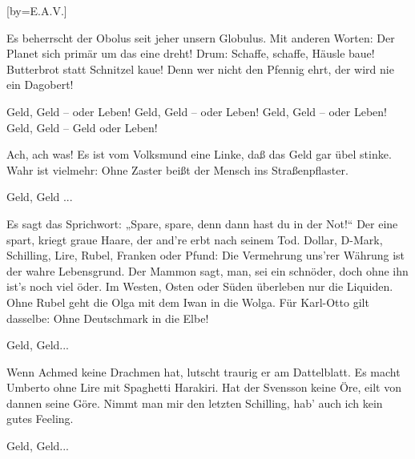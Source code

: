 [by={E.A.V.}]


\beginverse
Es beherrscht der Obolus seit jeher unsern Globulus.
Mit anderen Worten: Der Planet sich primär um das eine dreht!
Drum: Schaffe, schaffe, Häusle baue! Butterbrot statt Schnitzel kaue! 
Denn wer nicht den Pfennig ehrt, der wird nie ein Dagobert!
\endverse

\beginchorus
Geld, Geld -- oder Leben!
Geld, Geld -- oder Leben!
Geld, Geld -- oder Leben!
Geld, Geld -- Geld oder Leben!
\endchorus

\beginverse
Ach, ach was!
Es ist vom Volksmund eine Linke,
daß das Geld gar übel stinke.
Wahr ist vielmehr: Ohne Zaster
beißt der Mensch ins Straßenpflaster.

Geld, Geld ...
\endverse

\beginverse
Es sagt das Sprichwort: „Spare, spare,
denn dann hast du in der Not!“
Der eine spart, kriegt graue Haare,
der and're erbt nach seinem Tod.
\endverse
\beginverse
Dollar, D-Mark, Schilling, Lire,
Rubel, Franken oder Pfund:
Die Vermehrung uns'rer Währung
ist der wahre Lebensgrund.
\endverse
\beginverse
Der Mammon sagt, man, sei ein schnöder,
doch ohne ihn ist's noch viel öder.
Im Westen, Osten oder Süden
überleben nur die Liquiden.
\endverse
\beginverse
Ohne Rubel geht die Olga
mit dem Iwan in die Wolga.
Für Karl-Otto gilt dasselbe:
Ohne Deutschmark in die Elbe!

Geld, Geld...
\endverse

\beginverse
Wenn Achmed keine Drachmen hat,
lutscht traurig er am Dattelblatt.
Es macht Umberto ohne Lire
mit Spaghetti Harakiri.
\endverse
\beginverse
Hat der Svensson keine Öre,
eilt von dannen seine Göre.
Nimmt man mir den letzten Schilling,
hab' auch ich kein gutes Feeling.
\endverse

\beginchorus
Geld, Geld...
\endchorus


\endsong
